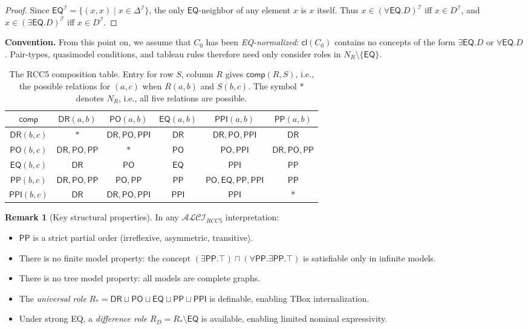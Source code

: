 \documentclass[a4paper,11pt]{article}
\theoremstyle{definition}
\newtheorem{remark}[theorem]{Remark}
\newcommand{\ALCIRCC}[1]{\ensuremath{\mathcal{ALCI}_{\mathit{RCC#1}}}}
\newcommand{\NR}{\ensuremath{N_R}}
\newcommand{\DeltaI}{\ensuremath{\Delta^{\mathcal{I}}}}
\newcommand{\interp}{\ensuremath{\mathcal{I}}}
\newcommand{\DR}{\ensuremath{\mathsf{DR}}}
\newcommand{\PO}{\ensuremath{\mathsf{PO}}}
\newcommand{\EQ}{\ensuremath{\mathsf{EQ}}}
\newcommand{\PP}{\ensuremath{\mathsf{PP}}}
\newcommand{\PPI}{\ensuremath{\mathsf{PPI}}}
\newcommand{\comp}{\ensuremath{\mathsf{comp}}}
\newcommand{\cl}{\ensuremath{\mathsf{cl}}}
\begin{document}
\begin{proof}
Since $\EQ^{\interp} = \{(x,x) \mid x \in \DeltaI\}$, the only
$\EQ$-neighbor of any element $x$ is $x$ itself.  Thus $x \in
(\forall \EQ.D)^{\interp}$ iff $x \in D^{\interp}$, and $x \in
(\exists \EQ.D)^{\interp}$ iff $x \in D^{\interp}$.
\end{proof}

\noindent
\textbf{Convention.}\; From this point on, we assume that $C_0$ has
been \emph{EQ-normalized}: $\cl(C_0)$ contains no concepts of the form
$\exists \EQ.D$ or $\forall \EQ.D$.  Pair-types, quasimodel
conditions, and tableau rules therefore need only consider roles in
$\NR \setminus \{\EQ\}$.

\begin{table}[t]
\centering
\caption{The RCC5 composition table.  Entry for row $S$, column $R$
gives $\comp(R,S)$, i.e., the possible relations for $(a,c)$ when
$R(a,b)$ and $S(b,c)$.  The symbol $*$ denotes $\NR$, i.e., all five
relations are possible.}
\label{tab:rcc5}
\smallskip
\renewcommand{\arraystretch}{1.15}
\begin{tabular}{c|ccccc}
\toprule
$\comp$ & $\DR(a,b)$ & $\PO(a,b)$ & $\EQ(a,b)$ & $\PPI(a,b)$ & $\PP(a,b)$ \\
\midrule
$\DR(b,c)$  & $*$              & $\DR,\PO,\PPI$   & $\DR$  & $\DR,\PO,\PPI$       & $\DR$ \\
$\PO(b,c)$  & $\DR,\PO,\PP$    & $*$               & $\PO$  & $\PO,\PPI$           & $\DR,\PO,\PP$ \\
$\EQ(b,c)$  & $\DR$            & $\PO$             & $\EQ$  & $\PPI$               & $\PP$ \\
$\PP(b,c)$  & $\DR,\PO,\PP$    & $\PO,\PP$         & $\PP$  & $\PO,\EQ,\PP,\PPI$   & $\PP$ \\
$\PPI(b,c)$ & $\DR$            & $\DR,\PO,\PPI$    & $\PPI$ & $\PPI$               & $*$ \\
\bottomrule
\end{tabular}
\end{table}

\begin{remark}[Key structural properties]
\label{rem:properties}
In any $\ALCIRCC{5}$ interpretation:
\begin{itemize}[nosep]
  \item $\PP$ is a strict partial order (irreflexive, asymmetric,
    transitive).
  \item There is no finite model property: the concept $(\exists
    \PP.\top) \sqcap (\forall \PP.\exists \PP.\top)$ is satisfiable
    only in infinite models.
  \item There is no tree model property: all models are complete
    graphs.
  \item The \emph{universal role} $R_* = \DR \sqcup \PO \sqcup \EQ
    \sqcup \PP \sqcup \PPI$ is definable, enabling TBox
    internalization.
  \item Under strong EQ, a \emph{difference role} $R_D = R_* \setminus
    \EQ$ is available, enabling limited nominal expressivity.
\end{itemize}
\end{remark}
\end{document}
